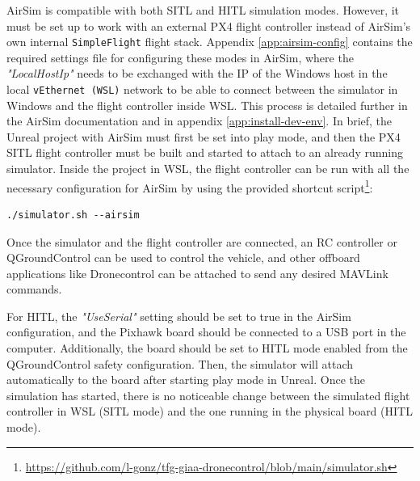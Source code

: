 AirSim is compatible with both SITL and HITL simulation modes.
However, it must be set up to work with an external PX4 flight controller instead of AirSim's own internal \texttt{SimpleFlight} flight stack.
Appendix \ref{app:airsim-config} contains the required settings file for configuring these modes in AirSim,
where the \emph{"LocalHostIp"} needs to be exchanged with the IP of the Windows host in the local \texttt{vEthernet (WSL)} network to be able to connect between the simulator in Windows and the flight controller inside WSL.
This process is detailed further in the AirSim documentation \cite{airsim-px4-wsl} and in appendix \ref{app:install-dev-env}.
In brief, the Unreal project with AirSim must first be set into play mode, and then the PX4 SITL flight controller must be built and started to attach to an already running simulator.
Inside the project in WSL, the flight controller can be run with all the necessary configuration for AirSim by using the provided shortcut script\footnote{\url{https://github.com/l-gonz/tfg-giaa-dronecontrol/blob/main/simulator.sh}}:
\begin{verbatim}
./simulator.sh --airsim
\end{verbatim}
Once the simulator and the flight controller are connected, an RC controller or QGroundControl can be used to control the vehicle, and other offboard applications like Dronecontrol can be attached to send any desired MAVLink commands.

For HITL, the \emph{"UseSerial"} setting should be set to true in the AirSim configuration, and the Pixhawk board should be connected to a USB port in the computer.
Additionally, the board should be set to HITL mode enabled from the QGroundControl safety configuration.
Then, the simulator will attach automatically to the board after starting play mode in Unreal.
Once the simulation has started, there is no noticeable change between the simulated flight controller in WSL (SITL mode) and the one running in the physical board (HITL mode).
